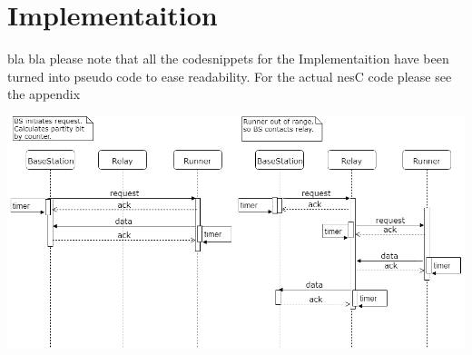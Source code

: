 \chapter{Implementaition}\label{ch:implementation}


bla bla please note that all the codesnippets for the Implementaition have been turned into pseudo code to ease readability. For the actual nesC code please see the appendix  




\includegraphics[width=0.7\linewidth]{theory/protocol/toHopOrNotArqSequence}
\label{fig:tohopornotarqsequence}





